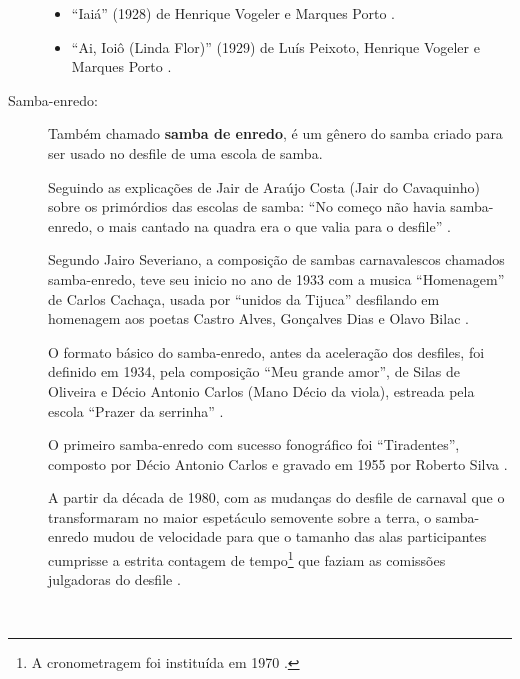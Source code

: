 \begin{description}
\begin{example}
\begin{itemize}
\item ``Iaiá'' (1928) de Henrique Vogeler e Marques Porto \cite[pp. 684,999]{marcondes1977enciclopediav2} \cite[pp. 63]{reinato2010musica}.
\item ``Ai, Ioiô (Linda Flor)'' (1929) de Luís Peixoto, Henrique Vogeler e Marques Porto \cite[pp. 684,899]{marcondes1977enciclopediav2} \cite[pp. 128]{perna2002samba} \cite[pp. 291]{dourado2004dicionario}.

\end{itemize}
\end{example}


\item[Samba-enredo:] 
Também chamado \textbf{samba de enredo}, é um gênero do samba criado para ser usado no desfile de uma escola de samba.

Seguindo as explicações de Jair de Araújo Costa (Jair do Cavaquinho) sobre os primórdios das escolas de samba: 
``No começo não havia samba-enredo, o mais cantado na quadra era o que valia para o desfile'' \cite[pp. 85]{de2003tem}.


Segundo Jairo Severiano, a composição de sambas carnavalescos chamados samba-enredo,
teve seu inicio no ano de 1933 com a musica ``Homenagem'' de Carlos Cachaça, usada por ``unidos da Tijuca''
desfilando em homenagem aos poetas Castro Alves, Gonçalves Dias e Olavo Bilac  \cite{rizzi2016musica}.

O formato básico do samba-enredo, antes da aceleração dos desfiles, foi definido em 1934, 
pela composição ``Meu grande amor'', 
de Silas de Oliveira e Décio Antonio Carlos (Mano Décio da viola), 
estreada pela escola ``Prazer da serrinha'' \cite[pp. 85-86]{de2003tem}.

O primeiro samba-enredo com sucesso fonográfico foi ``Tiradentes'', 
 composto por Décio Antonio Carlos e gravado em 1955 por Roberto Silva  \cite[pp. 86]{de2003tem}. 

A partir da década de 1980, 
com as mudanças do desfile de carnaval que o transformaram no maior espetáculo semovente sobre a terra, 
o samba-enredo mudou de velocidade para que o tamanho das alas participantes cumprisse 
a estrita contagem de tempo\footnote{A cronometragem foi instituída em 1970  \cite{rizzi2016musica}.} 
que faziam as comissões julgadoras do desfile \cite[pp. 88]{de2003tem} \cite{rizzi2016musica}.
\begin{example} ~


\end{example}
\end{description}
